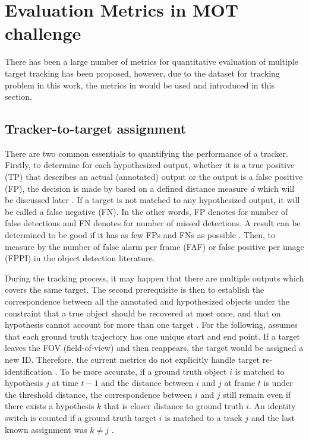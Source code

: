 \section{Evaluation Metrics in MOT challenge}
\hspace{0.5cm}There has been a large number of metrics for quantitative evaluation of multiple target tracking has been proposed, however, due to the dataset for tracking problem in this work, the metrics in \cite{Milan2016MOT16AB} would be used and introduced in this section.
\subsection{Tracker-to-target assignment}
There are two common essentials to quantifying the performance of a tracker. Firstly, to determine for each hypothesized output, whether it is a true positive (TP) that describes an actual (annotated) output or the output is a false positive (FP), the decision is made by based on a defined distance measure $d$ which will be discussed later \cite{Milan2016MOT16AB}. If a target is not matched to any hypothesized output, it will be called a false negative (FN). In the other words, FP denotes for number of false detections and FN denotes for number of missed detections\cite{sort}. A result can be determined to be good if it has as few FPs and FNs as possible \cite{Milan2016MOT16AB}. Then, to measure by the number of false alarm per frame (FAF) or false positive per image (FPPI) in the object detection literature.\par
During the tracking process, it may happen that there are multiple outputs which covers the same target. The second prerequisite is then to establish the correspondence between all the annotated and hypothesized objects under the constraint that a true object should be recovered at most once, and that on hypothesis cannot account for more than one target \cite{Milan2016MOT16AB}. For the following, \cite{Milan2016MOT16AB} assumes that each ground truth trajectory has one unique start and end point. If a target leaves the FOV (field-of-view) and then reappears, the target would be assigned a new ID. Therefore, the current metrics do not explicitly handle target re-identification \cite{Milan2016MOT16AB}. To be more accurate, if a ground truth object $i$ is matched to hypothesis $j$ at time $t-1$ and the distance between $i$ and $j$ at frame $t$ is under the threshold distance, the correspondence between $i$ and $j$ still remain even if there exists a hypothesis $k$ that is closer distance to ground truth $i$. An identity switch is counted if a ground truth target $i$ is matched to a track $j$ and the last known assignment was $k\neq j$ \cite{Milan2016MOT16AB}.\par
